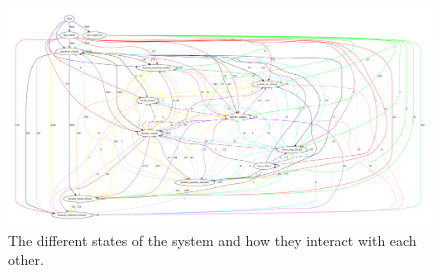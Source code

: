     \begin{figure}[H]
        \includegraphics[width=5in]{image/statesInteractionFalse-gvfile.pdf}
        \centering
        \caption[States in session and how they interact]{The different states of the system and how they interact with each other.}
        \label{figure:statesInteractions}
    \end{figure}











